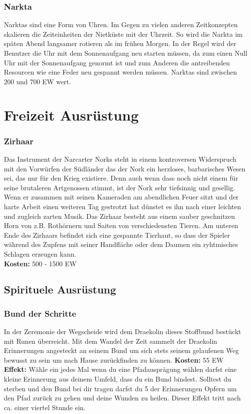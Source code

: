 \subsubsection*{Narkta}
Narktas sind eine Form von Uhren. Im Gegen zu vielen anderen Zeitkonzepten skalieren die Zeiteinheiten der Nietküste mit der Uhrzeit. So wird die Narkta im späten Abend langsamer rotieren als im frühen Morgen. In der Regel wird der Benutzer die Uhr mit dem Sonnenaufgang neu starten müssen, da zum einen Null Uhr mit der Sonnenaufgang genormt ist und zum Anderen die antreibenden Resourcen wie eine Feder neu gespannt werden müssen. Narktas sind zwischen 200 und 700 EW wert.


\section{Freizeit Ausrüstung}

\subsubsection*{Zirhaar}
Das Instrument der Narcarter Norks steht in einem kontroversen Widerspruch mit den Vorwürfen der Südländer das der Nork ein herzloses, barbarisches Wesen sei, das nur für den Krieg existiere. Denn auch wenn dass noch nicht einem für seine brutaleren Artgenossen stimmt, ist der Nork sehr tiefsinnig und gesellig. Wenn er zusammen mit seinen Kameraden am abendlichen Feuer sitzt und der harte Arbeit einen weiteren Tag gestrotzt hat dünstet es ihn nach einer leichten und zugleich zarten Musik. Das Zirhaar besteht aus einem sauber geschnitzen Horn von z.B. Rothörnern und Saiten von verschiedensten Tieren. Am unteren Ende des Zirhaars befindet sich eine gespannte Tierhaut, so dass der Spieler während des Zupfens mit seiner Handfläche oder dem Daumen ein ryhtmisches Schlagen erzeugen kann. \\
\textbf{Kosten:} 500 - 1500 EW


\subsection*{Spirituele Ausrüstung}

\subsubsection*{Bund der Schritte} \label{ar:bundderschritte}
In der Zeremonie der Wegscheide wird dem Draekolin dieses Stoffbund bestückt mit Runen überreicht. Mit dem Wandel der Zeit sammelt der Draekolin Erinnerungen angesteckt an seinem Bund um sich stets seinem gelaufenen Weg bewusst zu sein um nach Hause zurückfinden zu können.
\textbf{Kosten:} 55 EW\\
\textbf{Effekt:} Wähle ein jedes Mal wenn du eine Pfadausprägung wählen darfst eine kleine Erinnerung aus deinem Umfeld, dass du ein Bund bindest. Solltest du sterben und den Bund bei dir tragen darfst du 5 der Erinnerungen Opfern um den Pfad zurück zu gehen und deine Wunden zu heilen. Dieser Effekt tritt nach ca. einer viertel Stunde ein.

